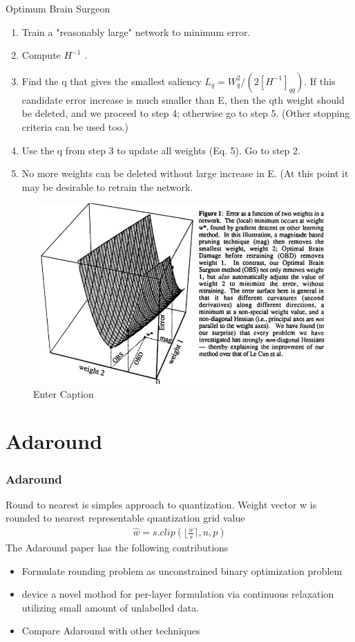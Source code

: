 \documentclass{beamer}
\theoremstyle{plain}
\theoremstyle{definition}
\theoremstyle{remark}
\numberwithin{equation}{section}
\numberwithin{figure}{section}
\numberwithin{theorem}{section}
\begin{document}
\begin{frame}{Optimum Brain Surgeon}
\begin{enumerate}
    \item Train a "reasonably large" network to minimum error.
    \item Compute $H^{-1}$ .
    \item Find the q that gives the smallest saliency $L_q = W_q^2/(2[H^{-1}]_{qq})$. If this candidate error
            increase is much smaller than E, then the qth weight should be deleted, and we
            proceed to step 4; otherwise go to step 5. (Other stopping criteria can be used too.)
    \item Use the q from step 3 to update all weights (Eq. 5). Go to step 2.
    \item No more weights can be deleted without large increase in E. (At this point it may be
desirable to retrain the network.
\end{enumerate}
\end{frame}
\begin{frame}
\begin{figure}
    \centering
    \includegraphics[width=0.9\linewidth]{obs.png}
    \caption{Enter Caption}
    \label{fig:enter-label}
\end{figure}
\end{frame}
\section{Adaround}
\begin{frame}
	\frametitle{Adaround}
	Round to nearest is simples approach to quantization.  Weight vector w is rounded to nearest representable quantization grid value
	\begin{align}
		\hat{w} = s . clip \left(\biggl\lfloor \frac{w}{s} \biggr\rceil, n, p \right)
	\end{align}
	The Adaround paper has the following contributions
	\begin{itemize}
		\item Formulate rounding problem as unconstrained binary optimization problem
		\item device a novel mothod for per-layer formulation via continuous relaxation utilizing small amount of unlabelled data.
		\item Compare Adaround with other techniques
	\end{itemize}
\end{frame}
\end{document}
